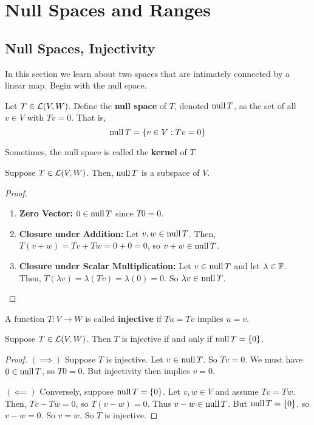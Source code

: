\section{Null Spaces and Ranges}
\subsection*{Null Spaces, Injectivity}
In this section we learn about two spaces that are intimately connected by a linear map. Begin with the null space.
\begin{definition}
    Let $T\in\mathcal{L}(V,W)$. Define the \textbf{null space} of $T$, denoted $\operatorname{null} T$, as the set of all $v\in V$ with $Tv = 0$. That is,
    \[ \operatorname{null} T = \{v\in V : Tv = 0\} \]
\end{definition}
Sometimes, the null space is called the \textbf{kernel} of $T$.
\begin{theorem}
    Suppose $T\in\mathcal{L}(V,W)$. Then, $\operatorname{null} T$ is a subspace of $V$.
\end{theorem}
\begin{proof}
    \begin{enumerate}
        \item \textbf{Zero Vector:} $0\in \operatorname{null} T$ since $T0 = 0$.
        \item \textbf{Closure under Addition:} Let $v,w\in \operatorname{null} T$. Then, $T(v+w) = Tv+Tw = 0+0 = 0$, so $v+w\in \operatorname{null} T$.
        \item \textbf{Closure under Scalar Multiplication:} Let $v\in \operatorname{null} T$ and let $\lambda\in\mathbb F$. Then, $T(\lambda v) = \lambda(Tv) = \lambda(0) = 0$. So $\lambda v \in \operatorname{null} T$.
    \end{enumerate} 
\end{proof}
\begin{definition}[Injective]
    A function $T: V\to W$ is called \textbf{injective} if $Tu=Tv$ implies $u=v$.
\end{definition}
\begin{theorem}
    Suppose $T\in\mathcal{L}(V,W)$. Then $T$ is injective if and only if $\operatorname{null} T = \{0\}$.
\end{theorem}
\begin{proof}
    $(\implies)$ Suppose $T$ is injective. Let $v\in \operatorname{null} T$. So $Tv = 0$. We must have $0\in \operatorname{null} T$, so $T0=0$. But injectivity then implies $v=0$. 

    $(\impliedby)$ Conversely, suppose $\operatorname{null} T = \{0\}$. Let $v,w\in V$ and assume $Tv=Tw$. Then, $Tv - Tw = 0$, so $T(v-w) = 0$. Thus $v-w\in \operatorname{null} T$. But $\operatorname{null} T = \{0\}$, so $v-w = 0$. So $v=w$. So $T$ is injective.
\end{proof}
